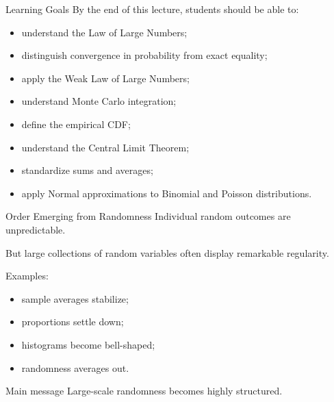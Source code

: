\setcounter{framenumber}{0}

\begin{frame}
  \titlepage
\end{frame}

\begin{frame}{Learning Goals}
By the end of this lecture, students should be able to:
\begin{itemize}
    \item understand the Law of Large Numbers;
    \item distinguish convergence in probability from exact equality;
    \item apply the Weak Law of Large Numbers;
    \item understand Monte Carlo integration;
    \item define the empirical CDF;
    \item understand the Central Limit Theorem;
    \item standardize sums and averages;
    \item apply Normal approximations to Binomial and Poisson distributions.
\end{itemize}
\end{frame}


\begin{frame}{Order Emerging from Randomness}
Individual random outcomes are unpredictable.

\vspace{0.25cm}

But large collections of random variables often display remarkable regularity.

\vspace{0.25cm}

Examples:
\begin{itemize}
    \item sample averages stabilize;
    \item proportions settle down;
    \item histograms become bell-shaped;
    \item randomness averages out.
\end{itemize}

\vspace{0.25cm}

\begin{keybox}{Main message}
Large-scale randomness becomes highly structured.
\end{keybox}
\end{frame}

